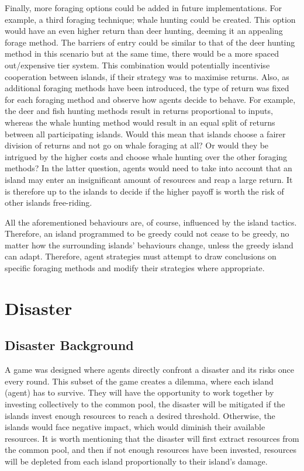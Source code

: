 Finally, more foraging options could be added in future implementations. For example, a third foraging technique; whale hunting could be created. This option would have an even higher return than deer hunting, deeming it an appealing forage method. The barriers of entry could be similar to that of the deer hunting method in this scenario but at the same time, there would be a more spaced out/expensive tier system. This combination would potentially incentivise cooperation between islands, if their strategy was to maximise returns. Also, as additional foraging methods have been introduced, the type of return was fixed for each foraging method and observe how agents decide to behave. For example, the deer and fish hunting methods result in returns proportional to inputs, whereas the whale hunting method would result in an equal split of returns between all participating islands. Would this mean that islands choose a fairer division of returns and not go on whale foraging at all? Or would they be intrigued by the higher costs and choose whale hunting over the other foraging methods? In the latter question, agents would need to take into account that an island may enter an insignificant amount of resources and reap a large return. It is therefore up to the islands to decide if the higher payoff is worth the risk of other islands free-riding.

All the aforementioned behaviours are, of course, influenced by the island tactics. Therefore, an island programmed to be greedy could not cease to be greedy, no matter how the surrounding islands’ behaviours change, unless the greedy island can adapt. Therefore, agent strategies must attempt to draw conclusions on specific foraging methods and modify their strategies where appropriate.

\newpage
\section{Disaster}
\label{sec: Disaster}
\subsection{Disaster Background}

A game was designed where agents directly confront a disaster and its risks once every round. This subset of the game creates a dilemma, where each island (agent) has to survive. They will have the opportunity to work together by investing collectively to the common pool, the disaster will be mitigated if the islands invest enough resources to reach a desired threshold. Otherwise, the islands would face negative impact, which would diminish their available resources. It is worth mentioning that the disaster will first extract resources from the common pool, and then if not enough resources have been invested, resources will be depleted from each island proportionally to their island’s damage.

